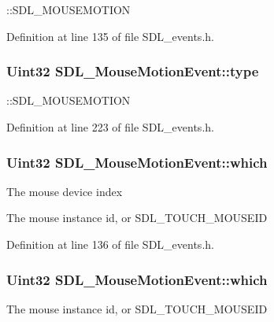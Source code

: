 \+::\+S\+D\+L\+\_\+\+M\+O\+U\+S\+E\+M\+O\+T\+I\+O\+N 

Definition at line 135 of file S\+D\+L\+\_\+events.\+h.

\hypertarget{structSDL__MouseMotionEvent_a431dd28cd6db6a7335cf633dbeb80cfb}{
\subsubsection[{type}]{\setlength{\rightskip}{0pt plus 5cm}Uint32 S\+D\+L\+\_\+\+Mouse\+Motion\+Event\+::type}}\label{structSDL__MouseMotionEvent_a431dd28cd6db6a7335cf633dbeb80cfb}
\+::\+S\+D\+L\+\_\+\+M\+O\+U\+S\+E\+M\+O\+T\+I\+O\+N 

Definition at line 223 of file S\+D\+L\+\_\+events.\+h.

\hypertarget{structSDL__MouseMotionEvent_a6f04c17b4305683915e2fd2dc3c36dbc}{
\subsubsection[{which}]{\setlength{\rightskip}{0pt plus 5cm}Uint32 S\+D\+L\+\_\+\+Mouse\+Motion\+Event\+::which}}\label{structSDL__MouseMotionEvent_a6f04c17b4305683915e2fd2dc3c36dbc}
The mouse device index

The mouse instance id, or S\+D\+L\+\_\+\+T\+O\+U\+C\+H\+\_\+\+M\+O\+U\+S\+E\+I\+D 

Definition at line 136 of file S\+D\+L\+\_\+events.\+h.

\hypertarget{structSDL__MouseMotionEvent_a6f04c17b4305683915e2fd2dc3c36dbc}{
\subsubsection[{which}]{\setlength{\rightskip}{0pt plus 5cm}Uint32 S\+D\+L\+\_\+\+Mouse\+Motion\+Event\+::which}}\label{structSDL__MouseMotionEvent_a6f04c17b4305683915e2fd2dc3c36dbc}
The mouse instance id, or S\+D\+L\+\_\+\+T\+O\+U\+C\+H\+\_\+\+M\+O\+U\+S\+E\+I\+D 

